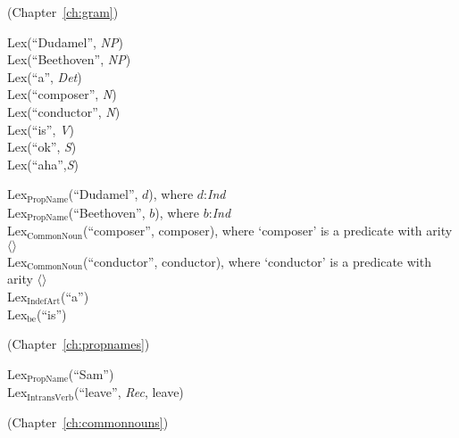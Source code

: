 (Chapter~\ref{ch:gram})

Lex(``Dudamel'', \textit{NP}) \\
Lex(``Beethoven'', \textit{NP}) \\
Lex(``a'', \textit{Det}) \\
Lex(``composer'', \textit{N}) \\
Lex(``conductor'', \textit{N}) \\
Lex(``is'', \textit{V}) \\
Lex(``ok'', \textit{S}) \\
Lex(``aha'',\textit{S})

Lex$_{\mathrm{PropName}}$(``Dudamel'', $d$), where $d$:\textit{Ind} \\
Lex$_{\mathrm{PropName}}$(``Beethoven'', $b$), where $b$:\textit{Ind}
\\
Lex$_{\mathrm{CommonNoun}}$(``composer'', composer), where `composer'
is a predicate with arity
$\langle$$\rangle$ \\ 
Lex$_{\mathrm{CommonNoun}}$(``conductor'', conductor), where `conductor'
is a predicate with arity
$\langle$$\rangle$ \\  
Lex$_{\mathrm{IndefArt}}$(``a'') \\
Lex$_{\mathrm{be}}$(``is'')

(Chapter~\ref{ch:propnames})

Lex$_{\mathrm{PropName}}$(``Sam'') \\
Lex$_{\mathrm{IntransVerb}}$(``leave'', \textit{Rec}, leave) 

(Chapter~\ref{ch:commonnouns})

